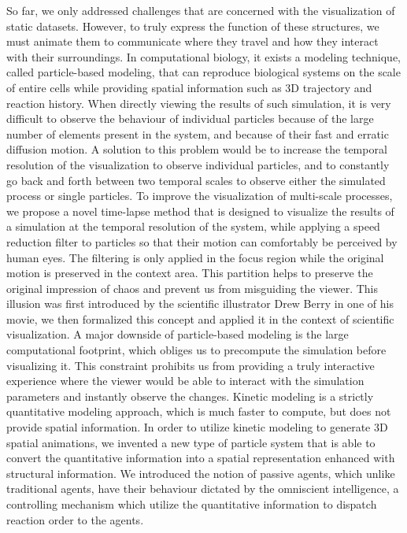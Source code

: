 So far, we only addressed challenges that are concerned with the visualization of static datasets.
However, to truly express the function of these structures, we must animate them to communicate where they travel and how they interact with their surroundings.
In computational biology, it exists a modeling technique, called particle-based modeling, that can reproduce biological systems on the scale of entire cells while providing spatial information such as 3D trajectory and reaction history.
When directly viewing the results of such simulation, it is very difficult to observe the behaviour of individual particles because of the large number of elements present in the system, and because of their fast and erratic diffusion motion.
A solution to this problem would be to increase the temporal resolution of the visualization to observe individual particles, and to constantly go back and forth between two temporal scales to observe either the simulated process or single particles.
To improve the visualization of multi-scale processes, we propose a novel time-lapse method that is designed to visualize the results of a simulation at the temporal resolution of the system, while applying a speed reduction filter to particles so that their motion can comfortably be perceived by human eyes.
The filtering is only applied in the focus region while the original motion is preserved in the context area.
This partition helps to preserve the original impression of chaos and prevent us from misguiding the viewer.
This illusion was first introduced by the scientific illustrator Drew Berry in one of his movie, we then formalized this concept and applied it in the context of scientific visualization.
A major downside of particle-based modeling is the large computational footprint, which obliges us to precompute the simulation before visualizing it.
This constraint prohibits us from providing a truly interactive experience where the viewer would be able to interact with the simulation parameters and instantly observe the changes.
Kinetic modeling is a strictly quantitative modeling approach, which is much faster to compute, but does not provide spatial information.
In order to utilize kinetic modeling to generate 3D spatial animations, we invented a new type of particle system that is able to convert the quantitative information into a spatial representation enhanced with structural information. 
We introduced the notion of passive agents, which unlike traditional agents, have their behaviour dictated by the omniscient intelligence, a controlling mechanism which utilize the quantitative information to dispatch reaction order to the agents.
